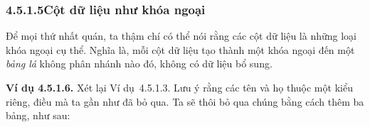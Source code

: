 \subsubsection*{4.5.1.5\quad Cột dữ liệu như khóa ngoại}

Để mọi thứ nhất quán, ta thậm chí có thể nói rằng các cột dữ liệu là những loại khóa ngoại cụ thể. Nghĩa là, mỗi cột dữ liệu tạo thành một khóa ngoại đến một \emph{bảng lá} không phân nhánh nào đó, không có dữ liệu bổ sung.

\noindent\textbf{Ví dụ 4.5.1.6.}\keepwithnext
Xét lại Ví dụ~4.5.1.3. Lưu ý rằng các tên và họ thuộc một kiểu riêng, điều mà ta gần như đã bỏ qua. Ta sẽ thôi bỏ qua chúng bằng cách thêm ba bảng, như sau:
